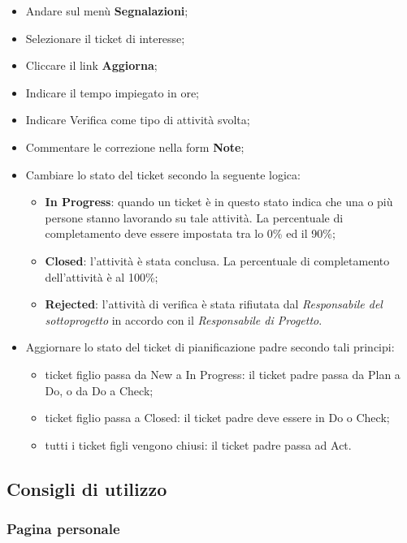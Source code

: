 \begin{itemize}
\item Andare sul menù \textbf{Segnalazioni}; 
\item Selezionare il ticket di interesse; 
\item Cliccare il link \textbf{Aggiorna}; 
\item Indicare il tempo impiegato in ore; 
\item Indicare Verifica come tipo di attività svolta; 
\item Commentare le correzione nella form \textbf{Note}; 
\item Cambiare lo stato del ticket secondo la seguente logica:
		\begin{itemize}
		\item \textbf{In Progress}: quando un ticket è in questo stato indica che una o più persone 
		stanno lavorando su tale attività. La percentuale di completamento deve 
		essere impostata tra lo 0\% ed il 90\%; 
		\item \textbf{Closed}: l’attività è stata conclusa. La percentuale di completamento dell’attività è al 100\%; 
		\item \textbf{Rejected}: l’attività di verifica è stata rifiutata dal \emph{Responsabile del sottoprogetto} in accordo con il \emph{Responsabile di Progetto}. 
		
		\end{itemize}

\item Aggiornare lo stato del ticket di pianificazione padre secondo tali principi:
		\begin{itemize}
		\item ticket figlio passa da New a In Progress: il ticket padre passa da Plan a Do, 
		o da Do a Check; 
		\item ticket figlio passa a Closed: il ticket padre deve essere in Do o Check; 
		\item tutti i ticket figli vengono chiusi: il ticket padre passa ad Act. 
		
		\end{itemize} 

\end{itemize} 




\subsection{Consigli di utilizzo}
\subsubsection{Pagina personale}
 
